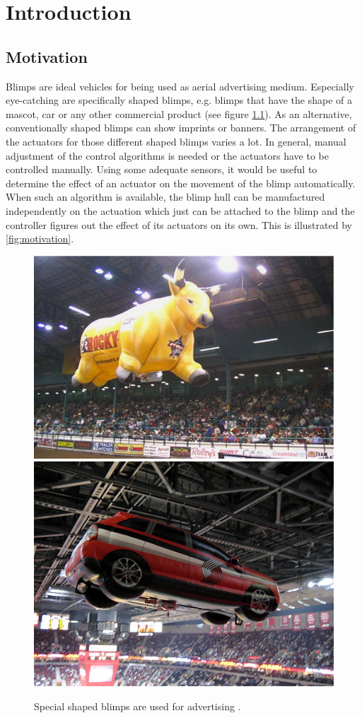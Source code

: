 \chapter{Introduction}
\label{chap:introduction}

\section{Motivation}
Blimps are ideal vehicles for being used as aerial advertising medium. Especially eye-catching are specifically shaped blimps, e.g. blimps that have the shape of a mascot, car or any other commercial product (see figure \ref{fig:blimps}).
As an alternative, conventionally shaped blimps can show imprints or banners.
The arrangement of the actuators for those different shaped blimps varies a lot.
In general, manual adjustment of the control algorithms is needed or the actuators have to be controlled manually.
Using some adequate sensors, it would be useful to determine the effect of an actuator on the movement of the blimp automatically.
When such an algorithm is available, the blimp hull can be manufactured independently on the actuation which just can be attached to the blimp and the controller figures out the effect of its actuators on its own.
This is illustrated by \cref{fig:motivation}.

\begin{figure}[hbtp]
\centering
\includegraphics[width=.4\linewidth]{images/CustomBull_Lg.jpg}
\includegraphics[width=.4\linewidth]{images/CustomCar.jpg}
\caption{Special shaped blimps are used for advertising \citep{rcblimps}.}
\label{fig:blimps}
\end{figure}

